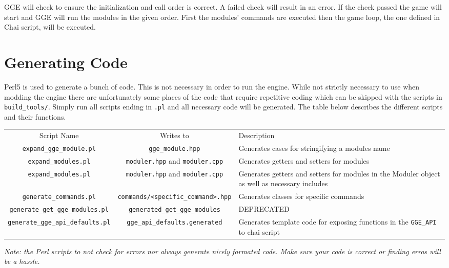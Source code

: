 \documentclass{article}
\begin{document}
GGE will check to ensure the initialization and call order is correct. 
A failed check will result in an error. 
If the check passed the game will start and GGE will run the modules in the given order.
First the modules' commands are executed then the game loop, the one defined in Chai script, will be executed.

\section{Generating Code} \label{generating code}
Perl5 is used to generate a bunch of code. This is not necessary in order to run the engine. 
While not strictly necessary to use when modding the engine there are unfortunately some places of the code that
require repetitive coding which can be skipped with the scripts in \verb|build_tools/|.
Simply run all scripts ending in \verb|.pl| and all necessary code will be generated. 
The table below describes the different scripts and their functions.

\begin{adjustbox}{width=\paperwidth}
\begin{tabular}{|c|c|l|}
	Script Name & Writes to & Description \\
	\verb|expand_gge_module.pl| & \verb|gge_module.hpp| & Generates cases for stringifying a modules name \\
	\verb|expand_modules.pl| & \verb|moduler.hpp| and \verb|moduler.cpp| & 
	Generates getters and setters for modules \\
	\verb|expand_modules.pl| & \verb|moduler.hpp| and \verb|moduler.cpp| & 
	Generates getters and setters for modules in the Moduler object as well as necessary includes \\
	\verb|generate_commands.pl| & \verb|commands/<specific_command>.hpp| & 
	Generates classes for specific commands\\
	\verb|generate_get_gge_modules.pl| & \verb|generated_get_gge_modules| & 
	DEPRECATED \\
	\verb|generate_gge_api_defaults.pl| & \verb|gge_api_defaults.generated| & 
	Generates template code for exposing functions in the \verb|GGE_API| to chai script \\
\end{tabular}
\end{adjustbox}

\textit{
	Note: the Perl scripts to not check for errors nor always generate nicely formated code.
	Make sure your code is correct or finding erros will be a hassle.
}
\end{document}
